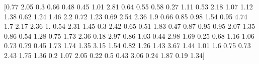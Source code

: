 \documentclass[preview]{standalone}
\begin{document}
\begin{center}
[0.77 2.05 0.3  0.66 0.48 0.45 1.01 2.81 0.64 0.55 0.58 0.27 1.11 0.53
 2.18 1.07 1.12 1.38 0.62 1.24 1.46 2.2  0.72 1.23 0.69 2.54 2.36 1.9
 0.66 0.85 0.98 1.54 0.95 4.74 1.7  2.17 2.36 1.   0.54 2.31 1.45 0.3
 2.42 0.65 0.51 1.83 0.47 0.87 0.95 0.95 2.07 1.35 0.86 0.54 1.28 0.75
 1.73 2.36 0.18 2.97 0.86 1.03 0.44 2.98 1.69 0.25 0.68 1.16 1.06 0.73
 0.79 0.45 1.73 1.74 1.35 3.15 1.54 0.82 1.26 1.43 3.67 1.44 1.01 1.6
 0.75 0.73 2.43 1.75 1.36 0.2  1.07 2.05 0.22 0.5  0.43 3.06 0.24 1.87
 0.19 1.34]
\end{center}
\end{document}
